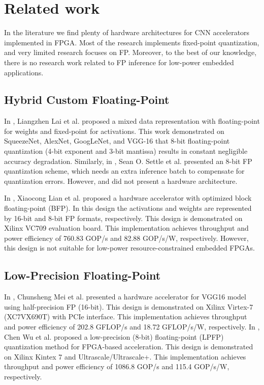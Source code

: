 \section{Related work}
\label{sec:related_work}
In the literature we find plenty of hardware architectures for CNN accelerators implemented in FPGA. Most of the research implements fixed-point quantization, and very limited research focuses on FP. Moreover, to the best of our knowledge, there is no research work related to FP inference for low-power embedded applications.


\subsection{Hybrid Custom Floating-Point}
In \cite{lai2017deep}, Liangzhen Lai et al. proposed a mixed data representation with floating-point for weights and fixed-point for activations. This work demonstrated on SqueezeNet, AlexNet, GoogLeNet, and VGG-16 that 8-bit floating-point quantization (4-bit exponent and 3-bit mantissa) results in constant negligible accuracy degradation. Similarly, in \cite{settle2018quantizing}, Sean O. Settle et al. presented an 8-bit FP quantization scheme, which needs an extra inference batch to compensate for quantization errors. However, \cite{lai2017deep} and \cite{settle2018quantizing} did not present a hardware architecture.

In \cite{lian2019high}, Xiaocong Lian et al. proposed a hardware accelerator with optimized block floating-point (BFP). In this design the activations and weights are represented by 16-bit and 8-bit FP formats, respectively. This design is demonstrated on Xilinx VC709 evaluation board. This implementation achieves throughput and power efficiency of 760.83 GOP/s and 82.88 GOP/s/W, respectively. However, this design is not suitable for low-power resource-constrained embedded FPGAs.

\subsection{Low-Precision Floating-Point}
In \cite{mei2017200mhz}, Chunsheng Mei et al. presented a hardware accelerator for VGG16 model using half-precision FP (16-bit). This design is demonstrated on Xilinx Virtex-7 (XC7VX690T) with PCIe interface. This implementation achieves throughput and power efficiency of 202.8 GFLOP/s and 18.72 GFLOP/s/W, respectively. In \cite{wu2021low}, Chen Wu et al. proposed a low-precision (8-bit) floating-point (LPFP) quantization method for FPGA-based acceleration. This design is demonstrated on Xilinx Kintex 7 and Ultrascale/Ultrascale+. This implementation achieves throughput and power efficiency of 1086.8 GOP/s and 115.4 GOP/s/W, respectively.

